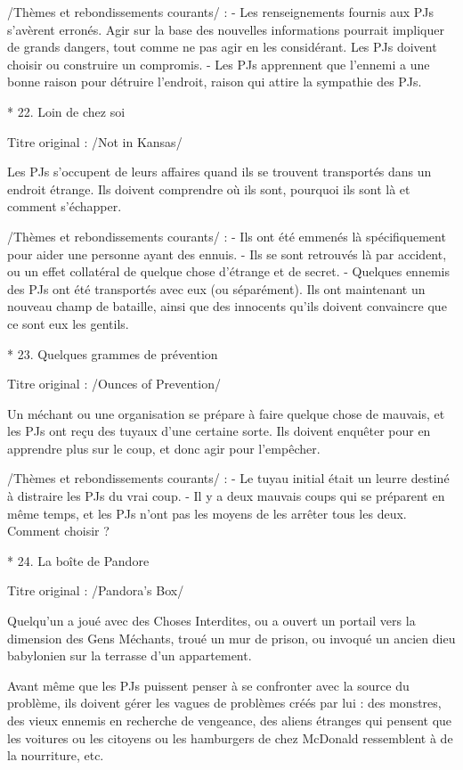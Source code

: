 \begin{enumerate}
/Thèmes et rebondissements courants/ :
- Les renseignements fournis aux PJs s'avèrent erronés. Agir sur la base des nouvelles informations pourrait impliquer de grands dangers, tout comme ne pas agir en les considérant. Les PJs doivent choisir ou construire un compromis.
- Les PJs apprennent que l'ennemi a une bonne raison pour détruire l'endroit, raison qui attire la sympathie des PJs.

* 22. Loin de chez soi

Titre original : /Not in Kansas/

Les PJs s'occupent de leurs affaires quand ils se trouvent transportés dans un endroit étrange. Ils doivent comprendre où ils sont, pourquoi ils sont là et comment s'échapper.

/Thèmes et rebondissements courants/ :
- Ils ont été emmenés là spécifiquement pour aider une personne ayant des ennuis.
- Ils se sont retrouvés là par accident, ou un effet collatéral de quelque chose d'étrange  et de secret.
- Quelques ennemis des PJs ont été transportés avec eux (ou séparément). Ils ont maintenant un nouveau champ de bataille, ainsi que des innocents qu'ils doivent convaincre que ce sont eux les gentils.

* 23. Quelques grammes de prévention

Titre original : /Ounces of Prevention/

Un méchant ou une organisation se prépare à faire quelque chose de mauvais, et les PJs ont reçu des tuyaux d'une certaine sorte. Ils doivent enquêter pour en apprendre plus sur le coup, et donc agir pour l'empêcher.

/Thèmes et rebondissements courants/ :
- Le tuyau initial était un leurre destiné à distraire les PJs du vrai coup.
- Il y a deux mauvais coups qui se préparent en même temps, et les PJs n'ont pas les moyens de les arrêter tous les deux. Comment choisir ?

* 24. La boîte de Pandore

Titre original : /Pandora's Box/

Quelqu'un a joué avec des Choses Interdites, ou a ouvert un portail vers la dimension des Gens Méchants, troué un mur de prison, ou invoqué un ancien dieu babylonien sur la terrasse d'un appartement.

Avant même que les PJs puissent penser à se confronter avec la source du problème, ils doivent gérer les vagues de problèmes créés par lui : des monstres, des vieux ennemis en recherche de vengeance, des aliens étranges qui pensent que les voitures ou les citoyens ou les hamburgers de chez McDonald ressemblent à de la nourriture, etc.


\end{enumerate}
